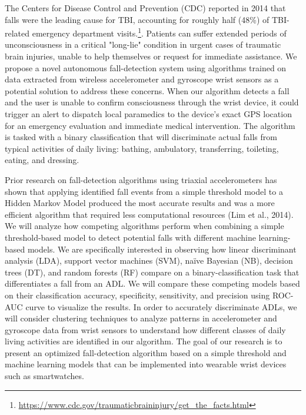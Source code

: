 \documentclass{llncs}
\begin{document}
	The Centers for Disease Control and Prevention (CDC) reported in 2014 that falls were the leading cause for TBI, accounting for roughly half (48\%) of TBI-related emergency department visits.\footnote{\url{https://www.cdc.gov/traumaticbraininjury/get_the_facts.html}}. Patients can suffer extended periods of unconsciousness in a critical "long-lie" condition in urgent cases of traumatic brain injuries, unable to help themselves or request for immediate assistance. We propose a novel autonomous fall-detection system using algorithms trained on data extracted from wireless accelerometer and gyroscope wrist sensors as a potential solution to address these concerns. When our algorithm detects a fall and the user is unable to confirm consciousness through the wrist device, it could trigger an alert to dispatch local paramedics to the device's exact GPS location for an emergency evaluation and immediate medical intervention. The algorithm is tasked with a binary classification that will discriminate actual falls from typical activities of daily living: bathing, ambulatory, transferring, toileting, eating, and dressing. 
	
	Prior research on fall-detection algorithms using triaxial accelerometers has shown that applying identified fall events from a simple threshold model to a Hidden Markov Model produced the most accurate results and was a more efficient algorithm that required less computational resources (Lim et al., 2014).\cite{lim2014fall} We will analyze how competing algorithms perform when combining a simple threshold-based model to detect potential falls with different machine learning-based models. We are specifically interested in observing how linear discriminant analysis (LDA), support vector machines (SVM), naïve Bayesian (NB), decision trees (DT), and random forests (RF) compare on a binary-classification task that differentiates a fall from an ADL. We will compare these competing models based on their classification accuracy, specificity, sensitivity, and precision using ROC-AUC curve to visualize the results. In order to accurately discriminate ADLs, we will consider clustering techniques to analyze patterns in accelerometer and gyroscope data from wrist sensors to understand how different classes of daily living activities are identified in our algorithm. The goal of our research is to present an optimized fall-detection algorithm based on a simple threshold and machine learning models that can be implemented into wearable wrist devices such as smartwatches. 
	
\end{document}

